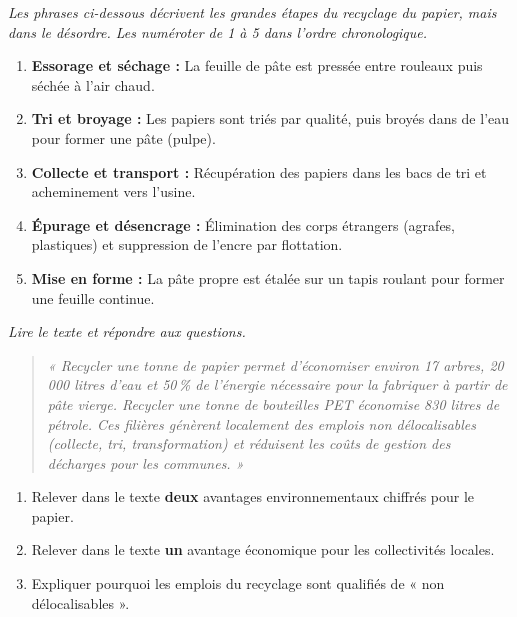 \documentclass[11pt]{article}
\begin{document}
\begin{exercice}
\emph{Les phrases ci-dessous décrivent les grandes étapes du recyclage du papier, mais dans le désordre. Les numéroter de 1 à 5 dans l'ordre chronologique.}
\begin{enumerate}
    \item[$\square$] \textbf{Essorage et séchage :} La feuille de pâte est pressée entre rouleaux puis séchée à l'air chaud.
    \item[$\square$] \textbf{Tri et broyage :} Les papiers sont triés par qualité, puis broyés dans de l'eau pour former une pâte (pulpe).
    \item[$\square$] \textbf{Collecte et transport :} Récupération des papiers dans les bacs de tri et acheminement vers l'usine.
    \item[$\square$] \textbf{Épurage et désencrage :} Élimination des corps étrangers (agrafes, plastiques) et suppression de l'encre par flottation.
    \item[$\square$] \textbf{Mise en forme :} La pâte propre est étalée sur un tapis roulant pour former une feuille continue.
\end{enumerate}
\end{exercice}

\begin{exercice}
\emph{Lire le texte et répondre aux questions.}
\begin{quote}
\textit{« Recycler une tonne de papier permet d'économiser environ 17 arbres, 20\,000 litres d'eau et 50\,\% de l'énergie nécessaire pour la fabriquer à partir de pâte vierge. Recycler une tonne de bouteilles PET économise 830 litres de pétrole. Ces filières génèrent localement des emplois non délocalisables (collecte, tri, transformation) et réduisent les coûts de gestion des décharges pour les communes. »}
\end{quote}
\begin{enumerate}
    \item Relever dans le texte \textbf{deux} avantages environnementaux chiffrés pour le papier.
    \item Relever dans le texte \textbf{un} avantage économique pour les collectivités locales.
    \item Expliquer pourquoi les emplois du recyclage sont qualifiés de « non délocalisables ».
\end{enumerate}
\end{exercice}
\end{document}
